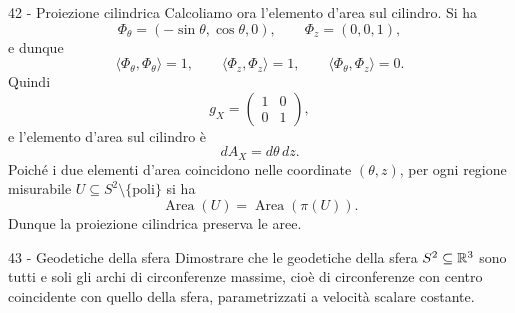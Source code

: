 \documentclass[a4paper]{article}
\begin{document}
\begin{snippetsolution}{42 - Proiezione cilindrica}
    Calcoliamo ora l'elemento d'area sul cilindro. Si ha
    \[
        \Phi_\theta=(-\sin\theta,\cos\theta,0),
        \qquad
        \Phi_z=(0,0,1),
    \]
    e dunque
    \[
        \langle\Phi_\theta,\Phi_\theta\rangle=1,
        \qquad
        \langle\Phi_z,\Phi_z\rangle=1,
        \qquad
        \langle\Phi_\theta,\Phi_z\rangle=0.
    \]
    Quindi
    \[
        g_X=
        \begin{pmatrix}
            1 & 0\\
            0 & 1
        \end{pmatrix},
    \]
    e l'elemento d'area sul cilindro è
    \[
        dA_X=d\theta\,dz.
    \]
    Poiché i due elementi d'area coincidono nelle coordinate \((\theta,z)\), per ogni regione misurabile \(U\subseteq S^2\setminus\{\text{poli}\}\) si ha
    \[
        \operatorname{Area}(U)=\operatorname{Area}(\pi(U)).
    \]
    Dunque la proiezione cilindrica preserva le aree.
\end{snippetsolution}

\begin{snippetexercise}{43 - Geodetiche della sfera}
    Dimostrare che le geodetiche della sfera
    \(S^2\subseteq\mathbb{R}^3\) sono tutti e soli gli archi di
    circonferenze massime, cioè di circonferenze con centro coincidente
    con quello della sfera, parametrizzati a velocità scalare costante.
\end{snippetexercise}
\end{document}
